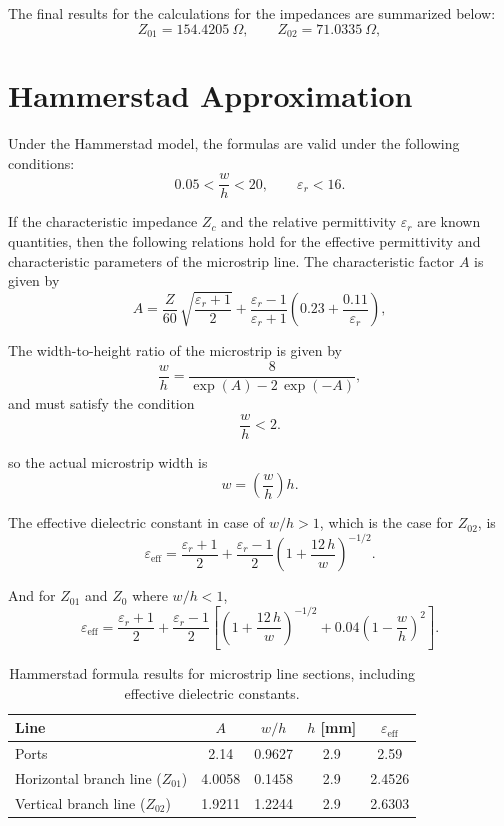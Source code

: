 \documentclass[a4paper,11pt]{article}
\begin{document}
The final results for the calculations for the impedances are summarized below:
\[
Z_{01} = 154.4205~\Omega, \qquad
Z_{02} = 71.0335~\Omega,
\]


\section{Hammerstad Approximation}

Under the Hammerstad model, the formulas are valid under the following conditions:
\[
0.05<\frac{w}{h} < 20, \qquad \varepsilon_r < 16.
\]

If the characteristic impedance \( Z_c \) and the relative permittivity \( \varepsilon_r \) are known quantities, then the following relations hold for the effective permittivity and characteristic parameters of the microstrip line.
The characteristic factor $A$ is given by
\[
A = \frac{Z}{60}\,\sqrt{\frac{\varepsilon_r + 1}{2}} 
      + \frac{\varepsilon_r - 1}{\varepsilon_r + 1} 
        \left(0.23 + \frac{0.11}{\varepsilon_r}\right),
\]


The width-to-height ratio of the microstrip is given by
\[
\frac{w}{h} = \frac{8}{\exp(A) - 2\,\exp(-A)},
\]
and must satisfy the condition
\[
\frac{w}{h} < 2.
\]

so the actual microstrip width is
\[
w = \left(\frac{w}{h}\right) h.
\]

The effective dielectric constant in case of $w/h > 1$, which is the case for $Z_{02}$, is 
\[
\varepsilon_{\text{eff}} = \frac{\varepsilon_r + 1}{2} 
+ \frac{\varepsilon_r - 1}{2} 
\left( 1 + \frac{12\,h}{w} \right)^{-1/2}.
\] 

And for $Z_{01}$ and $Z_0$ where $w/h < 1$,
\[
\varepsilon_{\text{eff}} = \frac{\varepsilon_r + 1}{2} 
+ \frac{\varepsilon_r - 1}{2} \left[ 
\left( 1 + \frac{12\,h}{w} \right)^{-1/2} 
+ 0.04 \left( 1 - \frac{w}{h} \right)^2 
\right].
\]
\begin{table}[h!]
\centering
\begin{tabular}{lcccc}
\toprule
\textbf{Line} & \textbf{$A$} & \textbf{$w/h$} & \textbf{$h$ [mm]} & \textbf{$\varepsilon_{\text{eff}}$} \\
\midrule
Ports & 2.14 & 0.9627 & 2.9 &  2.59 \\
Horizontal branch line ($Z_{01}$) & 4.0058 & 0.1458 & 2.9 & 2.4526\\
Vertical branch line ($Z_{02}$) & 1.9211 & 1.2244 & 2.9 & 2.6303 \\
\bottomrule
\end{tabular}
\caption{Hammerstad formula results for microstrip line sections, including effective dielectric constants.}
\end{table}
\end{document}
